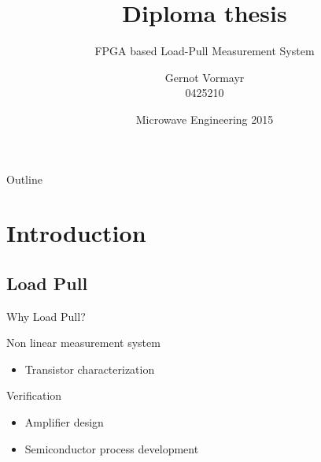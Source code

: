 \documentclass{beamer}
\title[FPGA based LP]{Diploma thesis}
\author[G.~Vormayr]{Gernot Vormayr\\0425210}
\institute[EMCE]{Institute of Electrodynamics, Microwave and Circuit Engineering}
\date[MW '15]{Microwave Engineering 2015}
\subtitle{FPGA based Load-Pull Measurement System}
\begin{document}
\begin{frame}
    \titlepage
\end{frame}

\begin{frame}{Outline}
  \tableofcontents
\end{frame}

\section{Introduction}
\subsection{Load Pull}

\begin{frame}{Why Load Pull?}
    \begin{block}{Non linear measurement system}
        \begin{itemize}
            \item Transistor characterization
        \end{itemize}
    \end{block}
    \begin{block}{Verification}
        \begin{itemize}
            \item Amplifier design
            \item Semiconductor process development
        \end{itemize}
    \end{block}
\end{frame}
\end{document}
